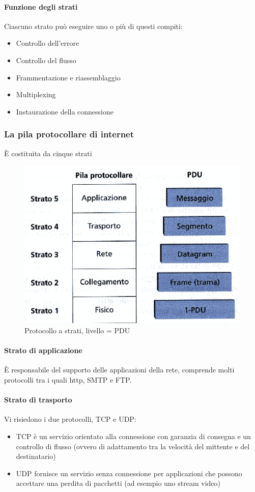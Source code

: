 \documentclass[11pt,a4paper]{article}
\begin{document}
\paragraph{Funzione degli strati}
Ciascuno strato può eseguire uno o più di questi compiti:
\begin{itemize}
	\item Controllo dell’errore
	\item Controllo del flusso
	\item Frammentazione e riassemblaggio
	\item Multiplexing
	\item Instaurazione della connessione
\end{itemize}
\subsubsection{La pila protocollare di internet}
È costituita da cinque strati

\begin{figure}
	\begin{center}
		\includegraphics[scale=1]{img/008.png}
		\caption{Protocollo a strati, livello = PDU}
	\end{center} 
\end{figure}

\paragraph{Strato di applicazione}
È responsabile del supporto delle applicazioni della rete, comprende molti protocolli tra i quali http, SMTP e FTP.
\paragraph{Strato di trasporto}
Vi risiedono i due protocolli, TCP e UDP:
\begin{itemize}
	\item TCP è un servizio orientato alla connessione con garanzia di consegna e un controllo di flusso (ovvero di adattamento tra la velocità del mittente e del destinatario)
	\item UDP fornisce un servizio senza connessione per applicazioni che possono accettare una perdita di pacchetti (ad esempio uno stream video)
\end{itemize}
\end{document}
